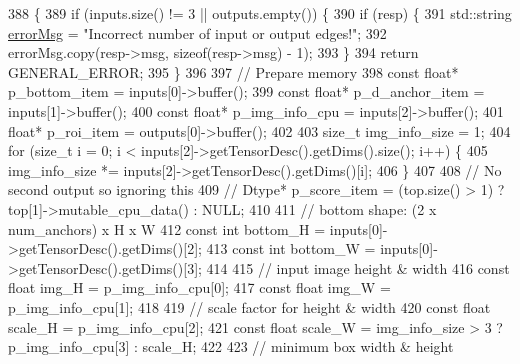 \begin{DoxyCode}
388                                                              \{
389         \textcolor{keywordflow}{if} (inputs.size() != 3 || outputs.empty()) \{
390             \textcolor{keywordflow}{if} (resp) \{
391                 std::string \hyperlink{classInferenceEngine_1_1Extensions_1_1Cpu_1_1ExtLayerBase_abc78e9b5a79fa339ffd831a5318f71f7}{errorMsg} = \textcolor{stringliteral}{"Incorrect number of input or output edges!"};
392                 errorMsg.copy(resp->msg, \textcolor{keyword}{sizeof}(resp->msg) - 1);
393             \}
394             \textcolor{keywordflow}{return} GENERAL\_ERROR;
395         \}
396 
397         \textcolor{comment}{// Prepare memory}
398         \textcolor{keyword}{const} \textcolor{keywordtype}{float}* p\_bottom\_item = inputs[0]->buffer();
399         \textcolor{keyword}{const} \textcolor{keywordtype}{float}* p\_d\_anchor\_item = inputs[1]->buffer();
400         \textcolor{keyword}{const} \textcolor{keywordtype}{float}* p\_img\_info\_cpu = inputs[2]->buffer();
401         \textcolor{keywordtype}{float}* p\_roi\_item = outputs[0]->buffer();
402 
403         \textcolor{keywordtype}{size\_t} img\_info\_size = 1;
404         \textcolor{keywordflow}{for} (\textcolor{keywordtype}{size\_t} i = 0; i < inputs[2]->getTensorDesc().getDims().size(); i++) \{
405             img\_info\_size *= inputs[2]->getTensorDesc().getDims()[i];
406         \}
407 
408         \textcolor{comment}{// No second output so ignoring this}
409         \textcolor{comment}{// Dtype* p\_score\_item = (top.size() > 1) ? top[1]->mutable\_cpu\_data() : NULL;}
410 
411         \textcolor{comment}{// bottom shape: (2 x num\_anchors) x H x W}
412         \textcolor{keyword}{const} \textcolor{keywordtype}{int} bottom\_H = inputs[0]->getTensorDesc().getDims()[2];
413         \textcolor{keyword}{const} \textcolor{keywordtype}{int} bottom\_W = inputs[0]->getTensorDesc().getDims()[3];
414 
415         \textcolor{comment}{// input image height & width}
416         \textcolor{keyword}{const} \textcolor{keywordtype}{float} img\_H = p\_img\_info\_cpu[0];
417         \textcolor{keyword}{const} \textcolor{keywordtype}{float} img\_W = p\_img\_info\_cpu[1];
418 
419         \textcolor{comment}{// scale factor for height & width}
420         \textcolor{keyword}{const} \textcolor{keywordtype}{float} scale\_H = p\_img\_info\_cpu[2];
421         \textcolor{keyword}{const} \textcolor{keywordtype}{float} scale\_W = img\_info\_size > 3 ? p\_img\_info\_cpu[3] : scale\_H;
422 
423         \textcolor{comment}{// minimum box width & height}

\end{DoxyCode}
